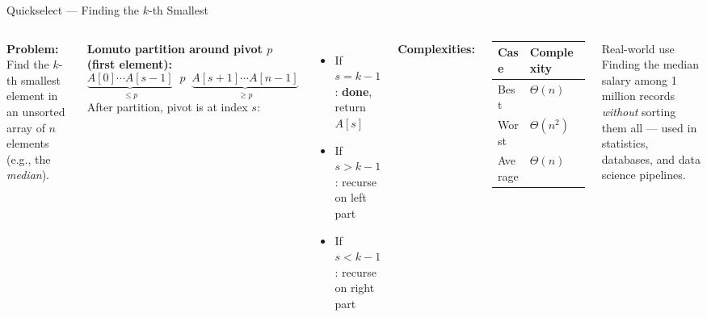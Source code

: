 \documentclass[aspectratio=169]{beamer}
\begin{document}
\begin{frame}[shrink=12]{Quickselect — Finding the $k$-th Smallest}
  \begin{columns}[T]
      \textbf{Problem:} Find the $k$-th smallest element in an unsorted
      array of $n$ elements (e.g., the \emph{median}).

      \vspace{0.3em}
      \textbf{Lomuto partition around pivot $p$ (first element):}
      \[
        \underbrace{A[0]\cdots A[s{-}1]}_{\leq p}
        \;\; p \;\;
        \underbrace{A[s{+}1]\cdots A[n{-}1]}_{\geq p}
      \]
      After partition, pivot is at index $s$:
      \begin{itemize}
        \item If $s = k-1$: \textbf{done}, return $A[s]$
        \item If $s > k-1$: recurse on left part
        \item If $s < k-1$: recurse on right part
      \end{itemize}
      \textbf{Complexities:}
      \begin{tabular}{ll}
        \toprule
        Case & Complexity \\
        \midrule
        Best  & $\Theta(n)$ \\
        Worst & $\Theta(n^2)$ \\
        Average & $\Theta(n)$ \\
        \bottomrule
      \end{tabular}
      \vspace{0.4em}
      \begin{exampleblock}{Real-world use}
        Finding the median salary among 1 million records
        \emph{without} sorting them all — used in statistics,
        databases, and data science pipelines.
      \end{exampleblock}
  \end{columns}
\end{frame}
\end{document}
